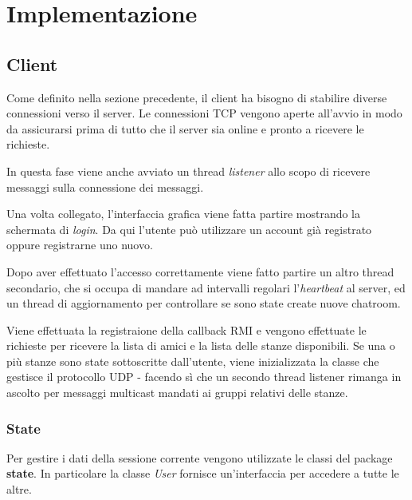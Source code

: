 \section{Implementazione}
\subsection{Client}
Come definito nella sezione precedente, il client ha bisogno di stabilire diverse connessioni verso il server. Le connessioni TCP vengono aperte all'avvio in modo da assicurarsi prima di tutto che il server sia online e pronto a ricevere le richieste.

In questa fase viene anche avviato un thread \textit{listener} allo scopo di ricevere messaggi sulla connessione dei messaggi.

Una volta collegato, l'interfaccia grafica viene fatta partire mostrando la schermata di \textit{login}. Da qui l'utente può utilizzare un account già registrato oppure registrarne uno nuovo.

Dopo aver effettuato l'accesso correttamente viene fatto partire un altro thread secondario, che si occupa di mandare ad intervalli regolari l'\textit{heartbeat} al server, ed un thread di aggiornamento per controllare se sono state create nuove chatroom.

Viene effettuata la registraione della callback RMI e vengono effettuate le richieste per ricevere la lista di amici e la lista delle stanze disponibili.
Se una o più stanze sono state sottoscritte dall'utente, viene inizializzata la classe che gestisce il protocollo UDP - facendo sì che un secondo thread listener rimanga in ascolto per messaggi multicast mandati ai gruppi relativi delle stanze.

\subsubsection{State}
Per gestire i dati della sessione corrente vengono utilizzate le classi del package \textbf{state}. In particolare la classe \textit{User} fornisce un'interfaccia per accedere a tutte le altre.

